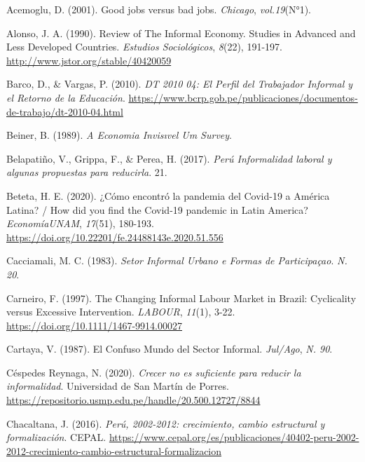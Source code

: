 \documentclass[
  letterpaper,
  12pt,
  oneside,
  spanish,
  doublespacing,
  headsepline,
  parskip]{MastersDoctoralThesis}
\newlength{\cslhangindent}
\newlength{\cslentryspacingunit} %
\newenvironment{CSLReferences}[2] %
 {%
  \setlength{\parindent}{0pt}
  \ifodd #1
  \let\oldpar\par
  \def\par{\hangindent=\cslhangindent\oldpar}
  \fi
  \setlength{\parskip}{#2\cslentryspacingunit}
 }%
 {}
\begin{document}
\hypertarget{refs}{}
\begin{CSLReferences}{1}{0}
\leavevmode{}%
Acemoglu, D. (2001). Good jobs versus bad jobs. \emph{Chicago},
\emph{vol.19}(N°1).

\leavevmode{}%
Alonso, J. A. (1990). Review of The Informal Economy. Studies in
Advanced and Less Developed Countries. \emph{Estudios Sociológicos},
\emph{8}(22), 191-197. \url{http://www.jstor.org/stable/40420059}

\leavevmode{}%
Barco, D., \& Vargas, P. (2010). \emph{DT 2010 04: El Perfil del
Trabajador Informal y el Retorno de la Educación}.
\url{https://www.bcrp.gob.pe/publicaciones/documentos-de-trabajo/dt-2010-04.html}

\leavevmode{}%
Beiner, B. (1989). \emph{A Economia Invis{ı}vel {\textemdash} Um
Survey}.

\leavevmode{}%
Belapatiño, V., Grippa, F., \& Perea, H. (2017). \emph{Perú \textbar{}
Informalidad laboral y algunas propuestas para reducirla}. 21.

\leavevmode{}%
Beteta, H. E. (2020). ¿Cómo encontró la pandemia del Covid-19 a América
Latina? / How did you find the Covid-19 pandemic in Latin America?
\emph{EconomíaUNAM}, \emph{17}(51), 180-193.
\url{https://doi.org/10.22201/fe.24488143e.2020.51.556}

\leavevmode{}%
Cacciamali, M. C. (1983). \emph{Setor Informal Urbano e Formas de
Participaçao}. \emph{N. 20}.

\leavevmode{}%
Carneiro, F. (1997). The Changing Informal Labour Market in Brazil:
Cyclicality versus Excessive Intervention. \emph{LABOUR}, \emph{11}(1),
3-22. \url{https://doi.org/10.1111/1467-9914.00027}

\leavevmode{}%
Cartaya, V. (1987). El Confuso Mundo del Sector Informal.
\emph{Jul/Ago}, \emph{N. 90}.

\leavevmode{}%
Céspedes Reynaga, N. (2020). \emph{Crecer no es suficiente para reducir
la informalidad}. Universidad de San Martín de Porres.
\url{https://repositorio.usmp.edu.pe/handle/20.500.12727/8844}

\leavevmode{}%
Chacaltana, J. (2016). \emph{Perú, 2002-2012: crecimiento, cambio
estructural y formalización}. CEPAL.
\url{https://www.cepal.org/es/publicaciones/40402-peru-2002-2012-crecimiento-cambio-estructural-formalizacion}


\end{CSLReferences}
\end{document}
